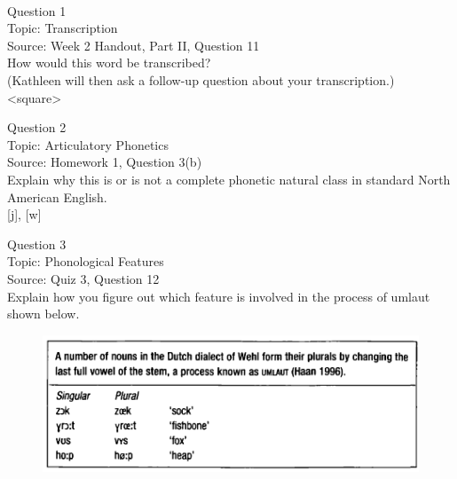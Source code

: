 \documentclass[12pt]{article}
\begin{document}
\newpage

\begin{center}
\textbf{{\color{red}{\HUGE END OF EXAM}}}\\

\end{center}
\newpage

\begin{center}
\textbf{{\color{blue}{\HUGE START OF EXAM\\}}}

\textbf{{\color{blue}{\HUGE Student ID: 37843\\}}}

\textbf{{\color{blue}{\HUGE \\}}}

\end{center}
\newpage

{\large Question 1}\\

Topic: Transcription\\
Source: Week 2 Handout, Part II, Question 11\\

How would this word be transcribed?\\ (Kathleen will then ask a follow-up question about your transcription.)\\

<square>


\newpage

{\large Question 2}\\

Topic: Articulatory Phonetics\\
Source: Homework 1, Question 3(b)\\

Explain why this is or is not a complete phonetic natural class in standard North American English.\\

{[j]}, {[w]}


\newpage

{\large Question 3}\\

Topic: Phonological Features\\
Source: Quiz 3, Question 12\\

Explain how you figure out which feature is involved in the process of umlaut shown below.\\

\begin{figure}[H]
\includegraphics{../images/dutch.png}
\end{figure}
\end{document}
